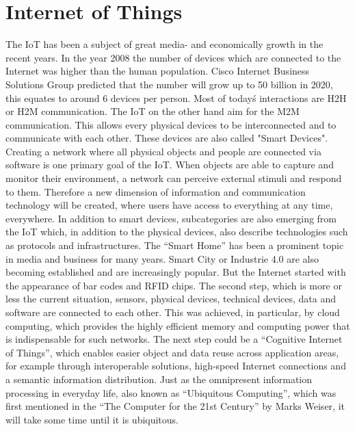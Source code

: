 \section{Internet of Things}
The \ac{IoT} has been a subject of great media- and economically growth in the recent years.
In the year 2008 the number of devices which are connected to the Internet was higher than the human population.\cite[cf.]{Eva11}
Cisco Internet Business Solutions Group predicted that the number will grow up to 50 billion in 2020, this equates to around 6 devices per person.\cite[cf.]{Eva11}
Most of today\'s interactions are \ac{H2H} or \ac{H2M} communication.
The \ac{IoT} on the other hand aim for the \ac{M2M} communication.
This allows every physical devices to be interconnected and to communicate with each other.
These devices are also called "Smart Devices".
Creating a network where all physical objects and people are connected via software is one primary goal of the \ac{IoT}.\cite[cf.]{Rui2015}\cite[cf.]{Kra13}
When objects are able to capture and monitor their environment, a network can perceive external stimuli and respond to them.\cite[cf.][p. 40]{Itu11}
Therefore a new dimension of information and communication technology will be created, where users have access to everything at any time, everywhere.
In addition to smart devices, subcategories are also emerging from the \ac{IoT} which, in addition to the physical devices, also describe technologies such as protocols and infrastructures.
The "`Smart Home"' has been a prominent topic in media and business for many years.
Smart City or Industrie 4.0 are also becoming established and are increasingly popular.
But the Internet started with the appearance of bar codes and \ac{RFID} chips.\cite[cf.]{Kra13}
The second step, which is more or less the current situation, sensors, physical devices, technical devices, data and software are connected to each other.\cite[cf.]{Kra13}
This was achieved, in particular, by cloud computing, which provides the highly efficient memory and computing power that is indispensable for such networks.\cite[cf.]{Rui2015}
The next step could be a "`Cognitive Internet of Things"', which enables easier object and data reuse across application areas, for example through interoperable solutions, high-speed Internet connections and a semantic information distribution.\cite[cf.]{Kra13}
Just as the omnipresent information processing in everyday life, also known as "`Ubiquitous Computing"', which was first mentioned in the "`The Computer for the 21st Century"'\cite[cf.]{Wei91} by Marks Weiser, it will take some time until it is ubiquitous.


